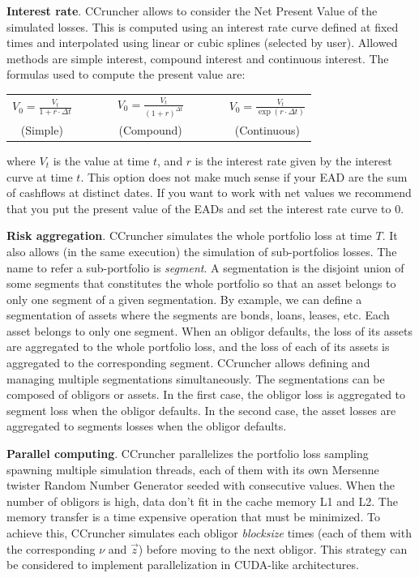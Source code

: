 \documentclass[11pt,fleqn]{book} %
\begin{document}
\textbf{Interest rate}. CCruncher allows to consider the Net Present Value 
of the simulated losses. This is computed using an interest rate curve 
defined at fixed times and interpolated using linear or cubic splines 
(selected by user). Allowed methods are simple interest, compound interest 
and continuous interest. The formulas used to compute the present value are:
\begin{center}
	\begin{tabular}{ccccc}
		$V_0 = \frac{V_t}{1+r \cdot \Delta t}$ & $\qquad$ &
		$V_0 = \frac{V_t}{(1+r)^{\Delta t}}$ & $\qquad$ &
		$V_0 = \frac{V_t}{\exp(r \cdot \Delta t)}$ \\
		(Simple) & $\qquad$ & (Compound) & $\qquad$ & (Continuous)
	\end{tabular}
\end{center}
where $V_t$ is the value at time $t$, and $r$ is the interest rate given 
by the interest curve at time $t$. This option does not make much sense
if your EAD are the sum of cashflows at distinct dates. If you want to work 
with net values we recommend that you put the present value of the EADs and 
set the interest rate curve to $0$.

\textbf{Risk aggregation}. 
\label{ss:ra}
CCruncher simulates the whole portfolio loss at time $T$. It also allows (in 
the same execution) the simulation of sub-portfolios losses. The name to refer
a sub-portfolio is \emph{segment}. A segmentation is the disjoint union of some 
segments that constitutes the whole portfolio so that an asset belongs to only 
one segment of a given segmentation. By example, we can define a segmentation
of assets where the segments are bonds, loans, leases, etc. Each asset
belongs to only one segment. When an obligor defaults, the loss of its assets
are aggregated to the whole portfolio loss, and the loss of each of its assets
is aggregated to the corresponding segment. CCruncher allows defining and 
managing multiple segmentations simultaneously. The segmentations can be 
composed of obligors or assets. In the first case, the obligor loss is 
aggregated to segment loss when the obligor defaults. In the second case, the 
asset losses are aggregated to segments losses when the obligor defaults.

\textbf{Parallel computing}. 
CCruncher parallelizes the portfolio loss sampling spawning multiple simulation
threads, each of them with its own Mersenne twister Random Number Generator 
seeded with consecutive values. When the number of obligors is high, data 
don't fit in the cache memory L1 and L2. The memory transfer is a time expensive
operation that must be minimized. To achieve this, CCruncher simulates each 
obligor \emph{blocksize} times (each of them with the corresponding $\nu$ and 
$\vec{z}$) before moving to the next obligor. This strategy can be considered 
to implement parallelization in CUDA-like architectures.
\end{document}

